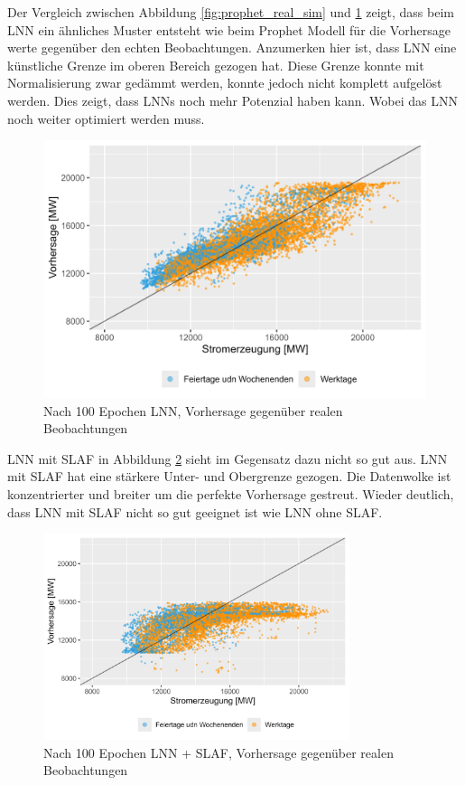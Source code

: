 \documentclass[11pt,ngerman,a4paper,]{article}
\begin{document}
Der Vergleich zwischen Abbildung \ref{fig:prophet_real_sim} und \ref{fig:slaf_lnn_100_epochs_lnn} zeigt, dass beim LNN ein ähnliches Muster entsteht wie beim Prophet Modell für die Vorhersage werte gegenüber den echten Beobachtungen. Anzumerken hier ist, dass LNN eine künstliche Grenze im oberen Bereich gezogen hat. Diese Grenze konnte mit Normalisierung zwar gedämmt werden, konnte jedoch nicht komplett aufgelöst werden. Dies zeigt, dass LNNs noch mehr Potenzial haben kann. Wobei das LNN noch weiter optimiert werden muss.

\begin{figure}[H]
\centering
\includegraphics[width=1.0\textwidth]{plots/real_to_fc_all_time_cobmined_nnLNN.png}
\caption{Nach 100 Epochen LNN, Vorhersage gegenüber realen Beobachtungen}
\label{fig:slaf_lnn_100_epochs_lnn}
\end{figure}

LNN mit SLAF in Abbildung \ref{fig:slaf_lnn_100_epochs_lnn_slaf} sieht im Gegensatz dazu nicht so gut aus. LNN mit SLAF hat eine stärkere Unter- und Obergrenze gezogen. Die Datenwolke ist konzentrierter und breiter um die perfekte Vorhersage gestreut. Wieder deutlich, dass LNN mit SLAF nicht so gut geeignet ist wie LNN ohne SLAF.

\begin{figure}[H]
\centering
\includegraphics[width=0.8\textwidth]{plots/real_to_fc_cobmined_nnLNN mit SLAF.png}
\caption{Nach 100 Epochen LNN + SLAF, Vorhersage gegenüber realen Beobachtungen}
\label{fig:slaf_lnn_100_epochs_lnn_slaf}
\end{figure}
\end{document}
